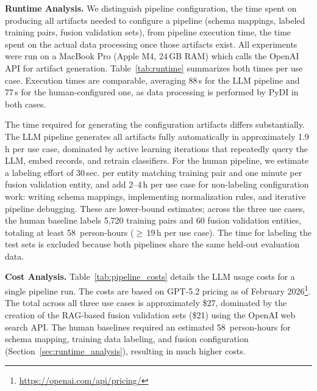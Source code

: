 \textbf{Runtime Analysis.}\label{sec:runtime_analysis} We distinguish pipeline configuration, the time spent on producing all artifacts needed to configure a pipeline (schema mappings, labeled training pairs, fusion validation sets), from pipeline execution time, the time spent on the actual data processing once those artifacts exist. All experiments were run on a MacBook Pro (Apple M4, 24\,GB RAM) which calls the OpenAI API for artifact generation. Table~\ref{tab:runtime} summarizes both times per use case. Execution times are comparable, averaging 88\,s for the LLM pipeline and 77\,s for the human-configured one, as data processing is performed by PyDI in both cases. 

The time required for generating the configuration artifacts differs substantially. The LLM pipeline generates all artifacts fully automatically in approximately 1.9\,h per use case, dominated by active learning iterations that repeatedly query the LLM, embed records, and retrain classifiers. For the human pipeline, we estimate a labeling effort of 30\,sec. per entity matching training pair and one minute per fusion validation entity, and add 2--4\,h per use case for non-labeling configuration work: writing schema mappings, implementing normalization rules, and iterative pipeline debugging. These are lower-bound estimates; across the three use cases, the human baseline labels 5,720 training pairs and 60 fusion validation entities, totaling at least 58~person-hours ($\geq$\,19\,h per use case). The time for labeling the test sets is excluded because both pipelines share the same held-out evaluation data. 




\textbf{Cost Analysis.}\label{sec:cost_analysis} Table~\ref{tab:pipeline_costs} details the LLM usage costs for a single pipeline run. The costs are based on GPT-5.2 pricing as of February 2026\footnote{\url{https://openai.com/api/pricing/}}. The total across all three use cases is approximately \$27, dominated by the creation of the RAG-based fusion validation sets (\$21) using the OpenAI web search API. The human baselines required an estimated 58~person-hours for schema mapping, training data labeling, and fusion configuration (Section~\ref{sec:runtime_analysis}), resulting in much higher costs.



